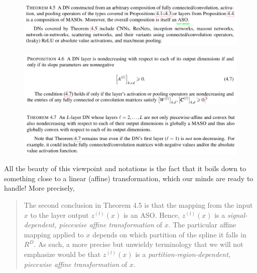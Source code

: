 \documentclass{article}
\begin{document}
\begin{figure}[h]
	\begin{center}
		\includegraphics[width=.8\linewidth]{Figure/prop4p5}
		\label{fig:prop4p5}
	\end{center}
\end{figure}

\begin{figure}[h]
	\begin{center}
		\includegraphics[width=.8\linewidth]{Figure/prop4p6}
		\label{fig:prop4p6}
	\end{center}
\end{figure}

\begin{figure}[h]
	\begin{center}
		\includegraphics[width=.8\linewidth]{Figure/prop4p7}
		\label{fig:prop4p7}
	\end{center}
\end{figure}


All the beauty of this viewpoint and notations is the fact that it boils down to something close to a linear (affine) transformation, which our minds are ready to handle! More precisely,
\begin{quote}
	The second conclusion in Theorem 4.5 is that the mapping from the input $x$ to the layer output $z^{(l)}(x)$ is an ASO. Hence, $z^{(l)}(x)$ is a \emph{signal-dependent, piecewise affine transformation} of $x$. The particular affine mapping applied to $x$ depends on which partition of the spline it falls in $R^D$.  As such, a more precise but unwieldy terminology that we will not emphasize would be that $z^{(l)}(x)$ is a \emph{partition-region-dependent, piecewise affine transformation} of $x$.
\end{quote}
\end{document}
